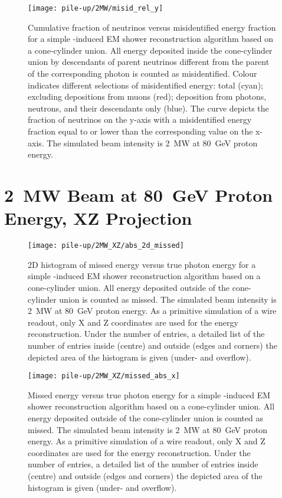 \begin{figure}[htb]
	\centering
	\texttt{[image: pile-up/2MW/misid\_rel\_y]}
	\caption{Cumulative fraction of neutrinos versus misidentified energy fraction for a simple \Pgpz-induced EM shower reconstruction algorithm based on a cone-cylinder union.
		All energy deposited inside the cone-cylinder union by descendants of parent neutrinos different from the parent of the corresponding \Pgpz photon is counted as misidentified.
		Colour indicates different selections of misidentified energy: total (cyan); excluding depositions from muons (red); deposition from photons, neutrons, and their descendants only (blue).
		The curve depicts the fraction of neutrinos on the y-axis with a misidentified energy fraction equal to or lower than the corresponding value on the x-axis.
		The simulated beam intensity is \SI{2}{\mega\watt} at \SI{80}{\giga\electronvolt} proton energy.}
\end{figure}


\section{\SI{2}{\mega\watt} Beam at \SI{80}{\giga\electronvolt} Proton Energy, XZ Projection}

\begin{figure}[htb]
	\centering
	\texttt{[image: pile-up/2MW\_XZ/abs\_2d\_missed]}
	\caption{2D histogram of missed energy versus true photon energy for a simple \Pgpz-induced EM shower reconstruction algorithm based on a cone-cylinder union.
		All energy deposited outside of the cone-cylinder union is counted as missed.
		The simulated beam intensity is \SI{2}{\mega\watt} at \SI{80}{\giga\electronvolt} proton energy.
		As a primitive simulation of a wire readout, only X and Z coordinates are used for the energy reconstruction.
		Under the number of entries, a detailed list of the number of entries inside (centre) and outside (edges and corners) the depicted area of the histogram is given (under- and overflow).}
\end{figure}

\begin{figure}[htb]
	\centering
	\texttt{[image: pile-up/2MW\_XZ/missed\_abs\_x]}
	\caption{Missed energy versus true photon energy for a simple \Pgpz-induced EM shower reconstruction algorithm based on a cone-cylinder union.
		All energy deposited outside of the cone-cylinder union is counted as missed.
		The simulated beam intensity is \SI{2}{\mega\watt} at \SI{80}{\giga\electronvolt} proton energy.
		As a primitive simulation of a wire readout, only X and Z coordinates are used for the energy reconstruction.
		Under the number of entries, a detailed list of the number of entries inside (centre) and outside (edges and corners) the depicted area of the histogram is given (under- and overflow).}
\end{figure}

